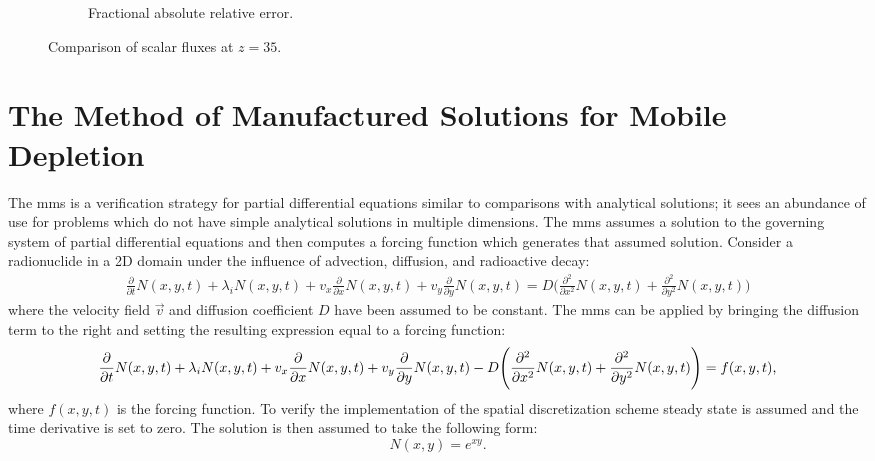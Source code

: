 \begin{figure}[H]
\begin{subfigure}[b]{0.47\textwidth}
        \caption{Fractional absolute relative error.}
        \label{fig:verification:sasf:error_z35}
    \end{subfigure}
    \caption{Comparison of scalar fluxes at $z = 35$.}
    \label{fig:verification:sasf:z35}
\end{figure}

\section{The Method of Manufactured Solutions for Mobile Depletion}
\label{verification:mms_mobile_depletion}

The \acrfull{mms} is a verification strategy for partial differential equations similar to comparisons with analytical solutions; it sees an abundance of use for problems which do not have simple analytical solutions in multiple dimensions. The \acrshort{mms} assumes a solution to the governing system of partial differential equations and then computes a forcing function which generates that assumed solution. Consider a radionuclide in a 2D domain under the influence of advection, diffusion, and radioactive decay:
\begin{align}\label{eq:simple_depletion}
    \frac{\partial}{\partial t}N(x,y,t) + \lambda_{i}N(x,y,t) + v_{x}\frac{\partial}{\partial x}N(x,y,t) + v_{y}\frac{\partial}{\partial y}N(x,y,t) = D\Bigg(\frac{\partial^{2}}{\partial x^2}N(x,y,t) + \frac{\partial^{2}}{\partial y^2}N(x,y,t)\Bigg)
\end{align}
where the velocity field $\vec{v}$ and diffusion coefficient $D$ have been assumed to be constant. The \acrshort{mms} can be applied by bringing the diffusion term to the right and setting the resulting expression equal to a forcing function:
\begin{equation}\label{eq:simple_depletion_force}
    \frac{\partial}{\partial t}N(x,y,t) + \lambda_{i}N(x,y,t) + v_{x}\frac{\partial}{\partial x}N(x,y,t) + v_{y}\frac{\partial}{\partial y}N(x,y,t) -D\Bigg(\frac{\partial^{2}}{\partial x^2}N(x,y,t) + \frac{\partial^{2}}{\partial y^2}N(x,y,t)\Bigg) \\= f(x,y,t)\text{,}
\end{equation}
where $f(x,y,t)$ is the forcing function. To verify the implementation of the spatial discretization scheme steady state is assumed and the time derivative is set to zero. The solution is then assumed to take the following form:
\begin{equation}\label{eq:mms_spatial_assumed}
    N(x,y) = e^{xy}\text{.}
\end{equation}
